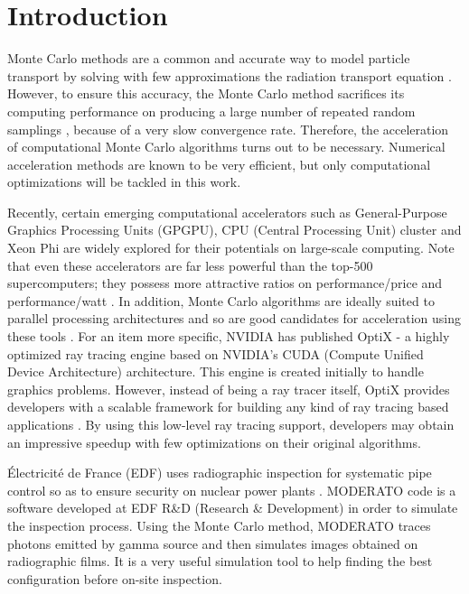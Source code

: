 
\chapter{Introduction} %

\label{Chapter1} %



Monte Carlo methods are a common and accurate way to model particle transport by solving with few approximations the radiation transport equation \citep{Reference1, Reference2}. However, to ensure this accuracy, the Monte Carlo method sacrifices its computing performance on producing a large number of repeated random samplings \citep{Reference4}, because of a very slow convergence rate. Therefore, the acceleration of computational Monte Carlo algorithms turns out to be necessary. Numerical acceleration methods are known to be very efficient, but only computational optimizations will be tackled in this work.

Recently, certain emerging computational accelerators such as General-Purpose Graphics Processing Units (GPGPU), CPU (Central Processing Unit) cluster and Xeon Phi are widely explored for their potentials on large-scale computing. Note that even these accelerators are far less powerful than the top-500 supercomputers; they possess more attractive ratios on performance/price and performance/watt \citep{Reference1}. In addition, Monte Carlo algorithms are ideally suited to parallel processing architectures and so are good candidates for acceleration using these tools \citep{Reference3}. For an item more specific, NVIDIA has published OptiX - a highly optimized ray tracing engine based on NVIDIA’s CUDA (Compute Unified Device Architecture) architecture. This engine is created initially to handle graphics problems. However, instead of being a ray tracer itself, OptiX provides developers with a scalable framework for building any kind of ray tracing based applications \citep{Reference6}. By using this low-level ray tracing support, developers may obtain an impressive speedup with few optimizations on their original algorithms.

Électricité de France (EDF) uses radiographic inspection for systematic pipe control so as to ensure security on nuclear power plants \citep{Reference5}. MODERATO code is a software developed at EDF R\&D (Research \& Development) in order to simulate the inspection process. Using the Monte Carlo method, MODERATO traces photons emitted by gamma source and then simulates images obtained on radiographic films. It is a very useful simulation tool to help finding the best configuration before on-site inspection.

